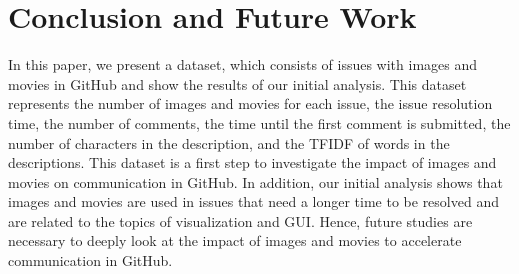 \section{Conclusion and Future Work}
\label{sec:conclusion}

In this paper, we present a dataset, 
which consists of issues with images and movies 
in GitHub and show the results of our initial analysis. 
This dataset represents the number of images and movies 
for each issue, 
the issue resolution time, 
the number of comments, 
the time until the first comment is submitted, 
the number of characters in the description, 
and the TFIDF of words in the descriptions. 
This dataset is a first step to investigate 
the impact of images and movies on communication in GitHub. 
In addition, our initial analysis shows that images and movies 
are used in issues that need a longer time to be resolved and 
are related to the topics of visualization and GUI. 
Hence, future studies are necessary to deeply look at 
the impact of images and movies to accelerate communication 
in GitHub.



